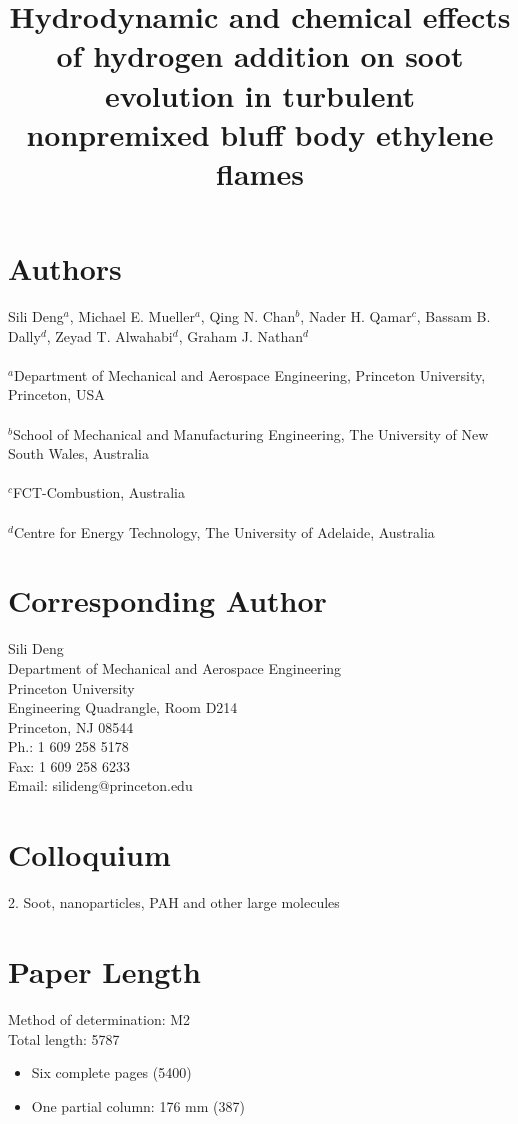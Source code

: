 \documentclass{article}
\title{Hydrodynamic and chemical effects of hydrogen addition on soot evolution in turbulent nonpremixed bluff body ethylene flames}
\date{}
\begin{document}
\maketitle

\section*{Authors}
Sili Deng$^a$, Michael E. Mueller$^a$, Qing N. Chan$^b$, Nader H. Qamar$^c$, Bassam B. Dally$^d$, Zeyad T. Alwahabi$^d$, Graham J. Nathan$^d$\\ \\
$^a$Department of Mechanical and Aerospace Engineering, Princeton University,
Princeton, USA\\ \\
$^b$School of Mechanical and Manufacturing Engineering, The University of New South Wales, Australia\\ \\
$^c$FCT-Combustion, Australia\\ \\
$^d$Centre for Energy Technology, The University of Adelaide, Australia\\


\section*{Corresponding Author}
Sili Deng\\
Department of Mechanical and Aerospace Engineering\\
Princeton University\\
Engineering Quadrangle, Room D214\\
Princeton, NJ 08544\\
Ph.: 1 609 258 5178\\
Fax: 1 609 258 6233\\
Email: silideng@princeton.edu

\section*{Colloquium}
2. Soot, nanoparticles, PAH and other large molecules

\section*{Paper Length}
Method of determination: M2\\
Total length: 5787\\
\begin{itemize}
  \item Six complete pages (5400)
  \item One partial column: 176 mm (387)
\end{itemize}
\end{document}
